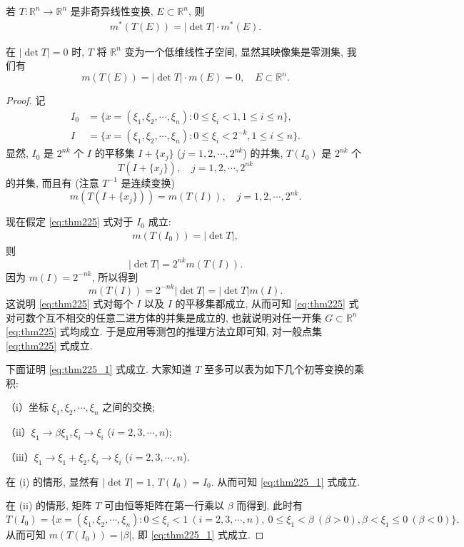 \documentclass[../../main.tex]{subfiles}%
\begin{document}
\begin{theorem}\label{theorem:集合的线性变换的像的外测度}
若 $T:\mathbb{R}^n\to\mathbb{R}^n$ 是非奇异线性变换, $E\subset\mathbb{R}^n$, 则
\begin{align}
m^*(T(E)) = |\det T|\cdot m^*(E).\label{eq:thm225}
\end{align}
\end{theorem}
\begin{remark}
在 $|\det T| = 0$ 时, $T$ 将 $\mathbb{R}^n$ 变为一个低维线性子空间, 显然其映像集是零测集, 我们有
\[
m(T(E)) = |\det T|\cdot m(E) = 0,\quad E\subset\mathbb{R}^n.
\] 
\end{remark}
\begin{proof}

记
\begin{align*}
I_0 &= \{x = (\xi_1,\xi_2,\cdots,\xi_n): 0\leqslant\xi_i < 1, 1\leqslant i\leqslant n\},\\
I &= \{x = (\xi_1,\xi_2,\cdots,\xi_n): 0\leqslant\xi_i < 2^{-k}, 1\leqslant i\leqslant n\}.
\end{align*}
显然, $I_0$ 是 $2^{nk}$ 个 $I$ 的平移集 $I + \{x_j\}$ ($j = 1,2,\cdots,2^{nk}$) 的并集, $T(I_0)$ 是 $2^{nk}$ 个
\[
T(I + \{x_j\}),\quad j = 1,2,\cdots,2^{nk}
\]
的并集, 而且有 (注意 $T^{-1}$ 是连续变换)
\[
m(T(I + \{x_j\})) = m(T(I)),\quad j = 1,2,\cdots,2^{nk}.
\]

现在假定 \eqref{eq:thm225} 式对于 $I_0$ 成立:
\begin{align}
m(T(I_0)) = |\det T|,\label{eq:thm225_1}
\end{align}
则
\[
|\det T| = 2^{nk}m(T(I)).
\]
因为 $m(I)=2^{-nk}$, 所以得到
\[
m(T(I)) = 2^{-nk}|\det T| = |\det T|m(I).
\]
这说明 \eqref{eq:thm225} 式对每个 $I$ 以及 $I$ 的平移集都成立, 从而可知 \eqref{eq:thm225} 式对可数个互不相交的任意二进方体的并集是成立的, 也就说明对任一开集 $G\subset\mathbb{R}^n$ \eqref{eq:thm225} 式均成立. 于是应用等测包的推理方法立即可知, 对一般点集 \eqref{eq:thm225} 式成立.

下面证明 \eqref{eq:thm225_1} 式成立. 大家知道 $T$ 至多可以表为如下几个初等变换的乘积:

（i）坐标 $\xi_1,\xi_2,\cdots,\xi_n$ 之间的交换;

（ii）$\xi_1\to\beta\xi_1,\xi_i\to\xi_i$ ($i = 2,3,\cdots,n$);

（iii）$\xi_1\to\xi_1 + \xi_2,\xi_i\to\xi_i$ ($i = 2,3,\cdots,n$).

在 (i) 的情形, 显然有 $|\det T| = 1$, $T(I_0)=I_0$. 从而可知 \eqref{eq:thm225_1} 式成立.

在 (ii) 的情形, 矩阵 $T$ 可由恒等矩阵在第一行乘以 $\beta$ 而得到, 此时有
\[
T(I_0) = \{x = (\xi_1,\xi_2,\cdots,\xi_n): 0\leqslant\xi_i < 1\ (i = 2,3,\cdots,n),\ 0\leqslant\xi_1 < \beta\ (\beta > 0), \beta < \xi_1\leqslant 0\ (\beta < 0)\}.
\]
从而可知 $m(T(I_0)) = |\beta|$, 即 \eqref{eq:thm225_1} 式成立.


\end{proof}
\end{document}
